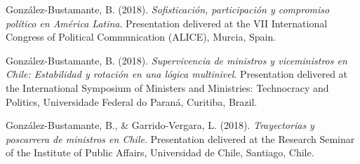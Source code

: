 \begin{publications}
\begin{benumerate}{87}

\item{González-Bustamante, B. (2018). {\itshape Sofisticación, participación y compromiso político en América Latina}. Presentation delivered at the VII International Congress of Political Communication (ALICE), Murcia, Spain.}\vspace{1mm}


\item{González-Bustamante, B. (2018). {\itshape Supervivencia de ministros y viceministros en Chile: Estabilidad y rotación en una lógica multinivel}. Presentation delivered at the International Symposium of Ministers and Ministries: Technocracy and Politics, Universidade Federal do Paraná, Curitiba, Brazil.}\vspace{1mm}


\item{González-Bustamante, B., \& Garrido-Vergara, L. (2018). {\itshape Trayectorias y poscarrera de ministros en Chile}. Presentation delivered at the Research Seminar of the Institute of Public Affairs, Universidad de Chile, Santiago, Chile.}\vspace{1mm}



\end{benumerate}
\end{publications}
